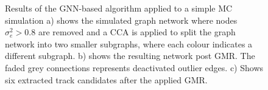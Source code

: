 \begin{center}
\begin{figure}[htbp!]%
    \centering
    \hfill
    \caption{Results of the GNN-based algorithm applied to a simple MC simulation a) shows the simulated graph network where nodes $\sigma_e^2 > 0.8$ are removed and a CCA is applied to split the graph network into two smaller subgraphs, where each colour indicates a different subgraph. b) shows the resulting network post GMR. The faded grey connections represents deactivated outlier edges. c) Shows six extracted track candidates after the applied GMR.}%
    \label{fig:example-application-2}%
\end{figure}
\end{center}

